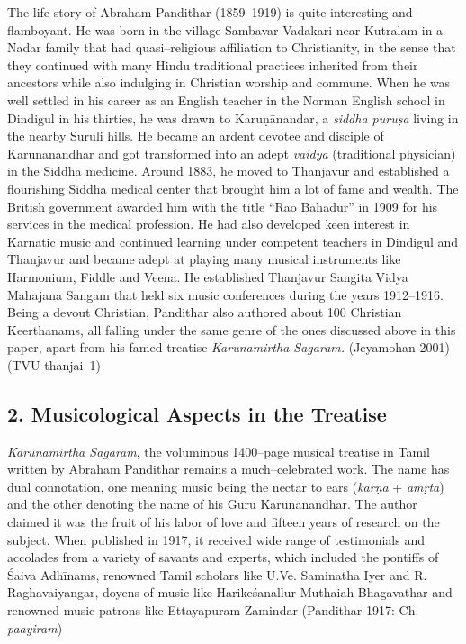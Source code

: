 The life story of Abraham Pandithar (1859–1919) is quite interesting and flamboyant. He was born in the village Sambavar Vadakari near Kutralam in a Nadar family that had quasi–religious affiliation to Christianity, in the sense that they continued with many Hindu traditional practices inherited from their ancestors while also indulging in Christian worship and commune. When he was well settled in his career as an English teacher in the Norman English school in Dindigul in his thirties, he was drawn to Karuṇānandar, a \textit{siddha puruṣa} living in the nearby Suruli hills. He became an ardent devotee and disciple of Karunanandhar and got transformed into an adept \textit{vaidya} (traditional physician) in the Siddha medicine. Around 1883, he moved to Thanjavur and established a flourishing Siddha medical center that brought him a lot of fame and wealth. The British government awarded him with the title “Rao Bahadur” in 1909 for his services in the medical profession. He had also developed keen interest in Karnatic music and continued learning under competent teachers in Dindigul and Thanjavur and became adept at playing many musical instruments like Harmonium, Fiddle and Veena. He established Thanjavur Sangita Vidya Mahajana Sangam that held six music conferences during the years 1912–1916. Being a devout Christian, Pandithar also authored about 100 Christian Keerthanams, all falling under the same genre of the ones discussed above in this paper, apart from his famed treatise \textit{Karunamirtha Sagaram. }(Jeyamohan 2001) (TVU thanjai–1)

\vspace{-.2cm}

\subsection*{2. Musicological Aspects in the Treatise}

\vspace{-.2cm}

\textit{Karunamirtha Sagaram}, the voluminous 1400–page musical treatise in Tamil written by Abraham Pandithar remains a much–celebrated work. The name has dual connotation, one meaning music being the nectar to ears (\textit{karṇa} + \textit{amṛta}) and the other denoting the name of his Guru Karunanandhar. The author claimed it was the fruit of his labor of love and fifteen years of research on the subject. When published in 1917, it received wide range of testimonials and accolades from a variety of savants and experts, which included the pontiffs of Śaiva Adhīnams, renowned Tamil scholars like U.Ve. Saminatha Iyer and R. Raghavaiyangar, doyens of music like Harikeśanallur Muthaiah Bhagavathar and renowned music patrons like Ettayapuram Zamindar (Pandithar 1917: Ch. \textit{paayiram})

